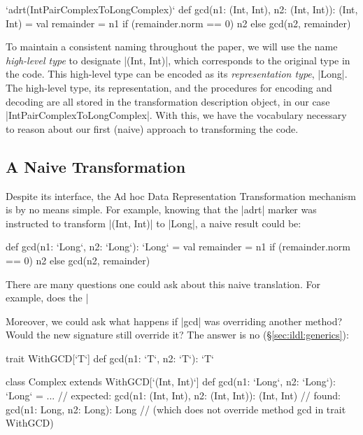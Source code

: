 \begin{lstlisting-nobreak}
`adrt(IntPairComplexToLongComplex)` {
  def gcd(n1: (Int, Int), n2: (Int, Int)): (Int, Int) = {
    val remainder = n1 %
    if (remainder.norm == 0) n2 else gcd(n2, remainder)
  }
}
\end{lstlisting-nobreak}

To maintain a consistent naming throughout the paper, we will
use the name \emph{high-level type} to designate |(Int, Int)|, which
corresponds to the original type in the code. This high-level type can
be encoded as its \emph{representation type}, |Long|. The high-level
type, its representation, and the procedures for encoding and decoding
are all stored in the transformation description object, in our case
|IntPairComplexToLongComplex|. With this, we have the vocabulary
necessary to reason about our first (naive) approach to transforming
the code.

\subsection{A Naive Transformation}

Despite its interface, the Ad hoc Data Representation Transformation mechanism is by no means simple. For example, knowing that the |adrt| marker was instructed to transform |(Int, Int)| to |Long|, a naive result could be:

\begin{lstlisting-nobreak}
def gcd(n1: `Long`, n2: `Long`): `Long` = {
  val remainder = n1 %
  if (remainder.norm == 0) n2 else gcd(n2, remainder)
}
\end{lstlisting-nobreak}

There are many questions one could ask about this naive translation. For example, does the |%

Moreover, we could ask what happens if |gcd| was overriding another method? Would the new signature still override it? The answer is no (\S\ref{sec:ildl:generics}):

\begin{lstlisting-nobreak}
trait WithGCD[`T`] {
  def gcd(n1: `T`, n2: `T`): `T`
}

class Complex extends WithGCD[`(Int, Int)`] {
  def gcd(n1: `Long`, n2: `Long`): `Long` = ...
  // expected: gcd(n1: (Int, Int), n2: (Int, Int)): (Int, Int)
  // found:    gcd(n1: Long, n2: Long): Long
  // (which does not override method gcd in trait WithGCD)
}
\end{lstlisting-nobreak}
%

